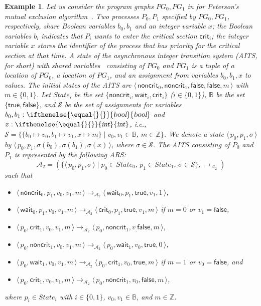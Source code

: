 \documentclass[10pt,a4paper]{article}
\newtheorem{example}[theorem]{Example}
\def\cA{\mathcal{A}}
\def\cS{\mathcal{S}}
\newcommand{\sort}[2][]{\ifthenelse{\equal{#1}{}}{\mbox{\sl{#2}}}{\mbox{\sl#1{#2}}}}
\newcommand{\symb}[1]{\mathsf{#1}}
\def\cApet{\cA_2}
\newcommand{\State}[1]{\langle\, #1 \,\rangle}
\newcommand{\StateSet}[1]{\mathit{State}_{#1}}
\begin{document}
\begin{example}\label{example:peterson-ec}
	Let us consider the \emph{program graphs} $\mathit{PG}_0, \mathit{PG}_1$ in  for \emph{Peterson's mutual exclusion algorithm}~\cite[Example~2.25]{BK08}.
	Two processes $P_0,P_1$ specified by $\mathit{PG}_0, \mathit{PG}_1$, respectively, share Boolean variables $b_0,b_1$ and an integer variable $x$;
	the Boolean variables $b_i$ indicates that $P_i$ wants to enter the critical section $\symb{crit}_i$;
	the integer variable $x$ stores the identifier of the process that has priority for the critical section at that time.
	A state of the \emph{asynchronous integer transition system} (AITS, for short) with shared variables~\cite{BK08} consisting of $\mathit{PG}_0$ and $\mathit{PG}_1$ is
	a tuple of a location of $\mathit{PG}_0$, a location of $\mathit{PG}_1$, and an \emph{assignment} from variables $b_0,b_1,x$ to values.
	The initial states of the AITS are
	$\State{\symb{noncrit}_0,\symb{noncrit}_1,\symb{false},\symb{false},m}$ with $m\in\{0,1\}$.
	Let $\StateSet{i}$ be the set $\{\symb{noncrit}_i,\symb{wait}_i,\symb{crit}_i\}$ ($i\in\{0,1\}$), $\mathbb{B}$ be the set $\{\symb{true},\symb{false}\}$, and $\cS$ be the set of assignments for variables $b_0,b_1:\sort{bool}$ and $x:\sort{int}$, i.e.,
	$\cS = \{ \{b_0\mapsto v_0, b_1 \mapsto v_1, x \mapsto m \} \mid v_0,v_1 \in \mathbb{B}, ~ m \in \mathbb{Z} \}$.
	We denote a state $\State{p_0,p_1,\sigma}$ by $\State{p_0,p_1,\sigma(b_0),\sigma(b_1),\sigma(x)}$, where $\sigma \in \cS$.
	The AITS consisting of $P_0$ and $P_1$ is represented by the following ARS:
	\[
		\cApet =
		(\{ \State{p_0,p_1,\sigma} \mid p_0 \in \StateSet{0}, \, p_1 \in \StateSet{1}, \, \sigma \in \cS \},
		\to_{\cApet})
	\]
	such that
	\begin{itemize}
		\item $\State{\symb{noncrit}_0,p_1,v_0,v_1,m} \to_{\cApet} \State{\symb{wait}_0,p_1,\symb{true},v_1,1}$,
		\item $\State{\symb{wait}_0,p_1,v_0,v_1,m} \to_{\cApet} \State{\symb{crit}_0,p_1,\symb{true},v_1,m}$
		      if $m=0$ or $v_1 = \symb{false}$,
		\item $\State{p_0,\symb{crit}_1,v_0,v_1,m} \to_{\cApet} \State{p_0,\symb{noncrit}_1,v_,\symb{false},m}$,
		\item $\State{p_0,\symb{noncrit}_1,v_0,v_1,m} \to_{\cApet} \State{p_0,\symb{wait}_1,v_0,\symb{true},0}$,
		\item $\State{p_0,\symb{wait}_1,v_0,v_1,m} \to_{\cApet} \State{p_0,\symb{crit}_1,v_0,\symb{true},m}$
		      if $m=1$ or $v_0 = \symb{false}$,
		      and
		\item $\State{p_0,\symb{crit}_1,v_0,v_1,m} \to_{\cApet} \State{p_0,\symb{noncrit}_1,v_0,\symb{false},m}$,
	\end{itemize}
	where
	$p_i \in \StateSet{i}$ with $i\in\{0,1\}$,
	$v_0,v_1 \in \mathbb{B}$,
	and
	$m \in \mathbb{Z}$.


\end{example}
\end{document}
